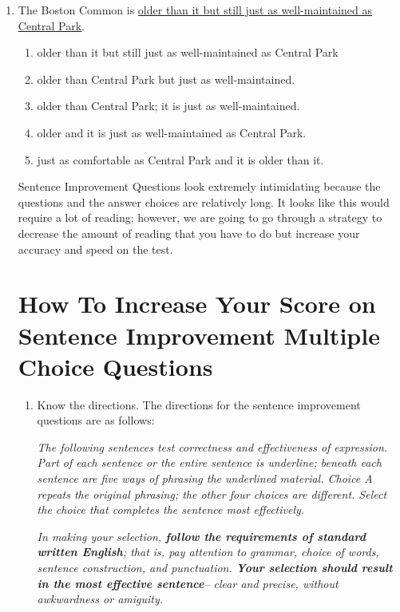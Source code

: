 \documentclass[12pt]{book}
\begin{document}
\begin{enumerate}
\item The Boston Common is \ul{ older than it but still just as well-maintained as Central Park}.
\begin{enumerate}[label=(\Alph*)]

\item older than it but still just as well-maintained as Central Park
\item older than Central Park but just as well-maintained.
\item  older than Central Park; it is just as well-maintained.
\item older and it is just as well-maintained as Central Park.
\item just as comfortable as Central Park and it is older than it.

\end{enumerate}

\bigskip
Sentence Improvement Questions look extremely intimidating because the questions and the answer choices are relatively long. It looks like this would require a lot of reading; however, we are going to go through a strategy to decrease the amount of reading that you have to do but increase your accuracy and speed on the test. 

\section[Sentence Improvement]{How To Increase Your Score on Sentence Improvement Multiple Choice Questions}
\begin{enumerate}
\item Know the directions. The directions for the sentence improvement questions are as follows:

\textit{The following sentences test correctness and effectiveness of expression. Part of each sentence or the entire sentence is underline; beneath each sentence are five ways of phrasing the underlined material. Choice A repeats the original phrasing; the other four choices are different. Select the choice that completes the sentence most effectively. }

\textit{In making your selection, \textbf{follow the requirements of standard written English}; that is, pay attention to grammar, choice of words, sentence construction, and punctuation. \textbf{Your selection should result in the most effective sentence}-- clear and precise, without awkwardness or amiguity.}


\end{enumerate}
\end{enumerate}
\end{document}
